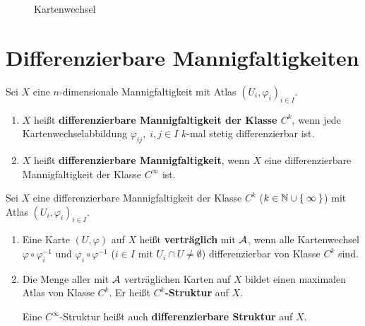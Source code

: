\begin{figure}[htp]
    \centering
    
    \caption{Kartenwechsel}
    \label{fig:kartenwechsel}
\end{figure}

\section{Differenzierbare Mannigfaltigkeiten}
\begin{definition}
    Sei $X$ eine $n$-dimensionale Mannigfaltigkeit mit Atlas $(U_i, \varphi_i)_{i \in I}$.

    \begin{enumerate}[label=\alph*)]
        \item $X$ heißt \textbf{differenzierbare Mannigfaltigkeit der Klasse $C^k$},
              wenn jede Kartenwechselabbildung $\varphi_{ij},\;i,j \in I$
              $k$-mal stetig differenzierbar ist.
        \item $X$ heißt \textbf{differenzierbare Mannigfaltigkeit},
              wenn $X$ eine differenzierbare Mannigfaltigkeit der
              Klasse $C^\infty$ ist.
    \end{enumerate}
\end{definition}

\begin{definition}
    Sei $X$ eine differenzierbare Mannigfaltigkeit der Klasse $C^k$ 
    ($k \in \mathbb{N} \cup \Set{\infty}$) mit Atlas $(U_i, \varphi_i)_{i \in I}$.

    \begin{enumerate}[label=\alph*)]
        \item Eine Karte $(U, \varphi)$ auf $X$ heißt \textbf{verträglich}
              mit $\mathcal{A}$, wenn alle Kartenwechsel $\varphi \circ \varphi_i^{-1}$
              und $\varphi_i \circ \varphi^{-1}$ ($i \in I$ mit $U_i \cap U \neq \emptyset$)
              differenzierbar von Klasse $C^k$ sind.
        \item Die Menge aller mit $\mathcal{A}$ verträglichen Karten auf 
              $X$ bildet einen maximalen Atlas von Klasse $C^k$. Er
              heißt \textbf{$C^k$-Struktur} auf $X$.
            
              Eine $C^\infty$-Struktur heißt auch \textbf{differenzierbare Struktur}
              auf $X$.
    \end{enumerate}
\end{definition}

